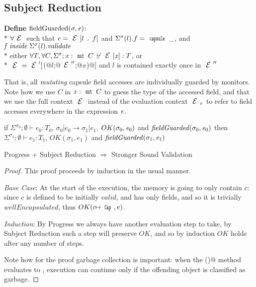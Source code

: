 \subsection{Subject Reduction}

\noindent\textbf{Define} $\text{fieldGuarded}(\sigma,\e)$:\\*
\indent$\forall \ctx$ such that $\e=\ctx[l\singleDot\f] $
and $\Sigma^\sigma(l).f=\Kw{capsule}\,\_$, and $\f\mathrel{\mathit{inside}} \Sigma^\sigma(l).\mathit{validate}$\\*
\indent\indent either 
$\forall T, \forall C, \Sigma^\sigma;\x:\Kw{mut}\,C\,\not\vdash\ctx[\x]:T$, or\\*
\indent\indent $\ctx=\ctx'[$\Q@M(@$l$\Q@;@$\ctx''$\Q@;@${\mathit{e}}$\Q@)@$]$ and $l$ is contained exactly once in $\ctx''$

That is, all \emph{mutating} capsule field accesses are individually guarded by monitors.
Note how we use $C$ in $\x:\Kw{mut}\,C$ to guess the type of the accessed field,
and that we use the full context $\ctx$ instead of the evaluation context $\ctx_v$
to refer to field accesses everywhere in the expression ${\mathit{e}}$.


\begin{theorem}
if $\Sigma^{\sigma_0};\emptyset\vdash e_0: T_0$,
$\sigma_0|e_0\rightarrow \sigma_1|e_1$,
$OK(\sigma_0,\e_0)$
and
$\mathit{fieldGuarded}(\sigma_0,\e_0)$
then
$\Sigma^{\sigma_1};\emptyset\vdash e_1: T_1$,
$OK(\sigma_1,e_1)$ and
$\mathit{fieldGuarded}(\sigma_1,\e_1)$
\end{theorem}

\begin{theorem}
	Progress + Subject Reduction $\Rightarrow$ Stronger Sound Validation
\end{theorem}
\begin{proof}
This proof proceeds by induction in the usual manner.

\emph{Base Case}: At the start of the execution, the memory is going to only contain $c$: since $c$ is defined to be initially $\mathit{valid}$, and has only \Q@mut@ fields, and so it is trivially $\mathit{wellEncapsulated}$, thus $OK(c\mapsto\Kw{Cap},e)$.

\emph{Induction}: By Progress we always have another evaluation step to take, by Subject Reduction such a step will preserve $\mathit{OK}$, and so by induction $\mathit{OK}$ holds after any number of steps.

Note how for the proof garbage collection is important: 
when the \Q@validate()@ method evaluates to \Q@false@, 
execution can continue only if the offending object is classified as garbage.
\end{proof}

